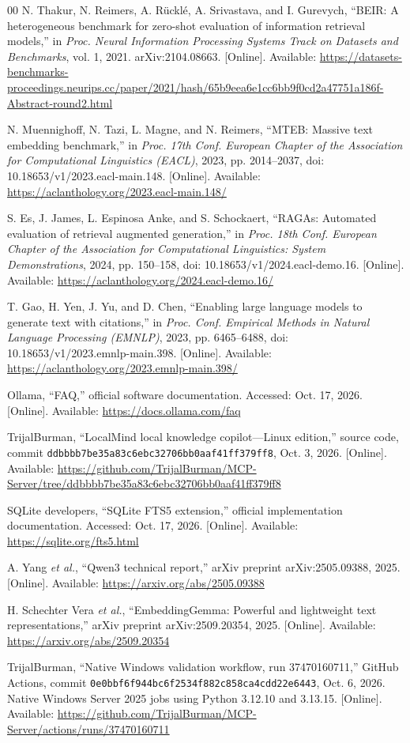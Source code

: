 \documentclass[conference,letterpaper]{IEEEtran}
\begin{document}
\begin{thebibliography}{00}
N. Thakur, N. Reimers, A. R{\"u}ckl{\'e}, A. Srivastava, and I. Gurevych, ``BEIR: A heterogeneous benchmark for zero-shot evaluation of information retrieval models,'' in \emph{Proc. Neural Information Processing Systems Track on Datasets and Benchmarks}, vol. 1, 2021. arXiv:2104.08663. [Online]. Available: \url{https://datasets-benchmarks-proceedings.neurips.cc/paper/2021/hash/65b9eea6e1cc6bb9f0cd2a47751a186f-Abstract-round2.html}

N. Muennighoff, N. Tazi, L. Magne, and N. Reimers, ``MTEB: Massive text embedding benchmark,'' in \emph{Proc. 17th Conf. European Chapter of the Association for Computational Linguistics (EACL)}, 2023, pp. 2014--2037, doi: 10.18653/v1/2023.eacl-main.148. [Online]. Available: \url{https://aclanthology.org/2023.eacl-main.148/}

S. Es, J. James, L. Espinosa Anke, and S. Schockaert, ``RAGAs: Automated evaluation of retrieval augmented generation,'' in \emph{Proc. 18th Conf. European Chapter of the Association for Computational Linguistics: System Demonstrations}, 2024, pp. 150--158, doi: 10.18653/v1/2024.eacl-demo.16. [Online]. Available: \url{https://aclanthology.org/2024.eacl-demo.16/}

T. Gao, H. Yen, J. Yu, and D. Chen, ``Enabling large language models to generate text with citations,'' in \emph{Proc. Conf. Empirical Methods in Natural Language Processing (EMNLP)}, 2023, pp. 6465--6488, doi: 10.18653/v1/2023.emnlp-main.398. [Online]. Available: \url{https://aclanthology.org/2023.emnlp-main.398/}

Ollama, ``FAQ,'' official software documentation. Accessed: Oct. 17, 2026. [Online]. Available: \url{https://docs.ollama.com/faq}

TrijalBurman, ``LocalMind local knowledge copilot---Linux edition,'' source code, commit \texttt{ddbbbb7be35a83c6ebc32706bb0aaf41ff379ff8}, Oct. 3, 2026. [Online]. Available: \url{https://github.com/TrijalBurman/MCP-Server/tree/ddbbbb7be35a83c6ebc32706bb0aaf41ff379ff8}

SQLite developers, ``SQLite FTS5 extension,'' official implementation documentation. Accessed: Oct. 17, 2026. [Online]. Available: \url{https://sqlite.org/fts5.html}

A. Yang \emph{et al.}, ``Qwen3 technical report,'' arXiv preprint arXiv:2505.09388, 2025. [Online]. Available: \url{https://arxiv.org/abs/2505.09388}

H. Schechter Vera \emph{et al.}, ``EmbeddingGemma: Powerful and lightweight text representations,'' arXiv preprint arXiv:2509.20354, 2025. [Online]. Available: \url{https://arxiv.org/abs/2509.20354}

TrijalBurman, ``Native Windows validation workflow, run 37470160711,'' GitHub Actions, commit \texttt{0e0bbf6f944bc6f2534f882c858ca4cdd22e6443}, Oct. 6, 2026. Native Windows Server 2025 jobs using Python 3.12.10 and 3.13.15. [Online]. Available: \url{https://github.com/TrijalBurman/MCP-Server/actions/runs/37470160711}

\end{thebibliography}
\end{document}
